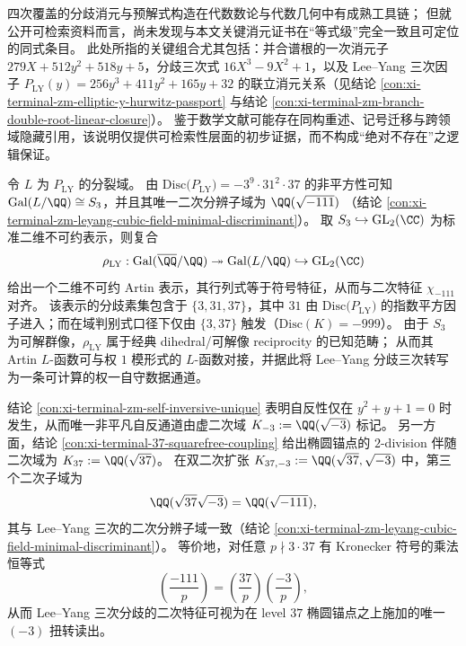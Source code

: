 \begin{remark}[可检索性注记]\label{rem:xi-terminal-zm-leyang-uv-literature-contrast}
四次覆盖的分歧消元与预解式构造在代数数论与代数几何中有成熟工具链；
但就公开可检索资料而言，尚未发现与本文关键消元证书在“等式级”完全一致且可定位的同式条目。
此处所指的关键组合尤其包括：并合谱根的一次消元子
\(
279X+512y^{2}+518y+5
\)，分歧三次式
\(
16X^{3}-9X^{2}+1
\)，以及 Lee--Yang 三次因子 \(P_{\mathrm{LY}}(y)=256y^{3}+411y^{2}+165y+32\) 的联立消元关系（见结论 \ref{con:xi-terminal-zm-elliptic-y-hurwitz-passport} 与结论 \ref{con:xi-terminal-zm-branch-double-root-linear-closure}）。
鉴于数学文献可能存在同构重述、记号迁移与跨领域隐藏引用，该说明仅提供可检索性层面的初步证据，而不构成“绝对不存在”之逻辑保证。
\end{remark}

\begin{remark}[二次分辨子域的规范特征与权一自守对接]\label{rem:xi-terminal-zm-leyang-artin-weight1-interface}
令 \(L\) 为 \(P_{\mathrm{LY}}\) 的分裂域。
由 \(\mathrm{Disc}\bigl(P_{\mathrm{LY}}\bigr)=-3^{9}\cdot 31^{2}\cdot 37\) 的非平方性可知 \(\mathrm{Gal}(L/\QQ)\cong S_3\)，并且其唯一二次分辨子域为
\(
\QQ(\sqrt{-111})
\)
（结论 \ref{con:xi-terminal-zm-leyang-cubic-field-minimal-discriminant}）。
取 \(S_3\hookrightarrow \mathrm{GL}_2(\CC)\) 为标准二维不可约表示，则复合
\[
\rho_{\mathrm{LY}}:\mathrm{Gal}(\overline{\QQ}/\QQ)\twoheadrightarrow \mathrm{Gal}(L/\QQ)\hookrightarrow \mathrm{GL}_2(\CC)
\]
给出一个二维不可约 Artin 表示，其行列式等于符号特征，从而与二次特征 \(\chi_{-111}\) 对齐。
该表示的分歧素集包含于 \(\{3,31,37\}\)，其中 \(31\) 由 \(\mathrm{Disc}\bigl(P_{\mathrm{LY}}\bigr)\) 的指数平方因子进入；而在域判别式口径下仅由 \(\{3,37\}\) 触发（\(\mathrm{Disc}(K)=-999\)）。
由于 \(S_3\) 为可解群像，\(\rho_{\mathrm{LY}}\) 属于经典 dihedral/可解像 reciprocity 的已知范畴；
从而其 Artin \(L\)-函数可与权 \(1\) 模形式的 \(L\)-函数对接，并据此将 Lee--Yang 分歧三次转写为一条可计算的权一自守数据通道。\cite{DeligneSerre1974WeightOne}
\end{remark}

\begin{remark}\label{rem:xi-terminal-zm-leyang-sqrtminus111-twist}
结论 \ref{con:xi-terminal-zm-self-inversive-unique} 表明自反性仅在 \(y^2+y+1=0\) 时发生，从而唯一非平凡自反通道由虚二次域
\(
K_{-3}:=\QQ(\sqrt{-3})
\)
标记。
另一方面，结论 \ref{con:xi-terminal-37-squarefree-coupling} 给出椭圆锚点的 \(2\)-division 伴随二次域为
\(
K_{37}:=\QQ(\sqrt{37})
\)。
在双二次扩张 \(K_{37,-3}:=\QQ(\sqrt{37},\sqrt{-3})\) 中，第三个二次子域为
\[
\QQ(\sqrt{37}\sqrt{-3})=\QQ(\sqrt{-111}),
\]
其与 Lee--Yang 三次的二次分辨子域一致（结论 \ref{con:xi-terminal-zm-leyang-cubic-field-minimal-discriminant}）。
等价地，对任意 \(p\nmid 3\cdot 37\) 有 Kronecker 符号的乘法恒等式
\[
\left(\frac{-111}{p}\right)=\left(\frac{37}{p}\right)\left(\frac{-3}{p}\right),
\]
从而 Lee--Yang 三次分歧的二次特征可视为在 level \(37\) 椭圆锚点之上施加的唯一 \((-3)\) 扭转读出。
\end{remark}

